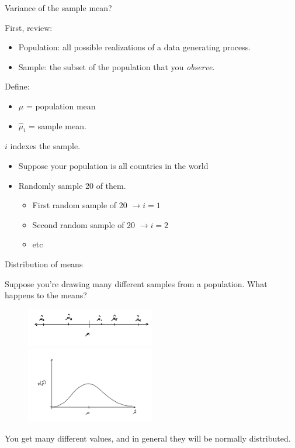 \documentclass[aspectratio=169]{beamer}
\begin{document}
\begin{frame}{Variance of the sample mean?}

First, review:
\begin{itemize}
\item Population: all possible realizations of a data generating process.  
\item Sample: the subset of the population that you \textit{observe}.  
\end{itemize}

Define:
\begin{itemize}
\item $\mu$ = population mean
\item $\hat{\mu}_i$ = sample mean.  
\end{itemize}

$i$ indexes the sample.  
\begin{itemize}
\item Suppose your population is all countries in the world
\item Randomly sample 20 of them.  
\begin{itemize}
\item First random sample of 20 $\rightarrow i = 1$
\item Second random sample of 20 $\rightarrow i = 2$
\item etc
\end{itemize}
\end{itemize}

\end{frame}

\begin{frame}{Distribution of means}

Suppose you're drawing many different samples from a population.  What happens to the means?
\pause
\begin{figure}
\includegraphics[width=0.5\textwidth]{figures/pop-sample-mean}
\includegraphics[width=0.5\textwidth]{figures/distribution}
\end{figure}

You get many different values, and in general they will be normally distributed.

\end{frame}
\end{document}
